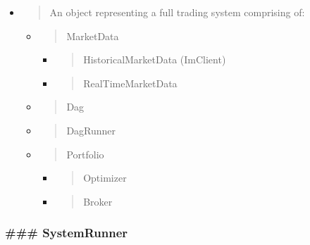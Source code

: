 \documentclass[11pt, reqno]{amsart}
\begin{document}
\begin{itemize}
\item
  \begin{quote}
  An object representing a full trading system comprising of:
  \end{quote}

  \begin{itemize}
  \item
    \begin{quote}
    MarketData
    \end{quote}

    \begin{itemize}
    \item
      \begin{quote}
      HistoricalMarketData (ImClient)
      \end{quote}
    \item
      \begin{quote}
      RealTimeMarketData
      \end{quote}
    \end{itemize}
  \item
    \begin{quote}
    Dag
    \end{quote}
  \item
    \begin{quote}
    DagRunner
    \end{quote}
  \item
    \begin{quote}
    Portfolio
    \end{quote}

    \begin{itemize}
    \item
      \begin{quote}
      Optimizer
      \end{quote}
    \item
      \begin{quote}
      Broker
      \end{quote}
    \end{itemize}
  \end{itemize}
\end{itemize}

\hypertarget{systemrunner}{%
\subsubsection{\texorpdfstring{\textbf{\#\#\#
SystemRunner}}{\#\#\# SystemRunner}}\label{systemrunner}}
\end{document}
